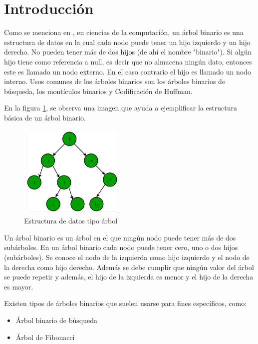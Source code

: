 \section{Introducción}

Como se menciona en \cite{R3}, en ciencias de la computación, un árbol binario es una estructura de datos en la cual cada nodo puede tener un hijo izquierdo y un hijo derecho. No pueden tener más de dos hijos (de ahí el nombre "binario"). Si algún hijo tiene como referencia a null, es decir que no almacena ningún dato, entonces este es llamado un nodo externo. En el caso contrario el hijo es llamado un nodo interno. Usos comunes de los árboles binarios son los árboles binarios de búsqueda, los montículos binarios y Codificación de Huffman.

En la figura \ref{fig:tree}, se observa una imagen que ayuda a ejemplificar la estructura básica de un árbol binario.

\begin{figure}[H]
\centering
\includegraphics[width=0.45\textwidth]{imgs/Labo9/tree.png}
\caption{Estructura de datos tipo árbol}
\label{fig:tree}
\end{figure}

Un árbol binario es un árbol en el que ningún nodo puede tener más de dos subárboles. En un árbol binario cada nodo puede tener cero, uno o dos hijos (subárboles). Se conoce el nodo de la izquierda como hijo izquierdo y el nodo de la derecha como hijo derecho. Además se debe cumplir que ningún valor del árbol se puede repetir y además, el hijo de la izquierda es menor y el hijo de la derecha es mayor.

Existen tipos de árboles binarios que suelen usarse para fines específicos, como:

\begin{itemize}
    \item Árbol binario de búsqueda
    \item Árbol de Fibonacci
\end{itemize}

